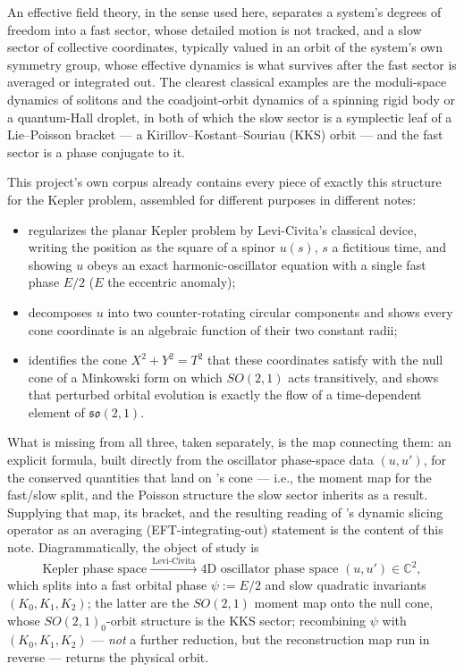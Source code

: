 \documentclass[11pt]{amsart}
\theoremstyle{remark}
\begin{document}
An effective field theory, in the sense used here, separates a system's degrees of freedom into a fast sector, whose detailed motion is not tracked, and a slow sector of collective coordinates, typically valued in an orbit of the system's own symmetry group, whose effective dynamics is what survives after the fast sector is averaged or integrated out. The clearest classical examples are the moduli-space dynamics of solitons and the coadjoint-orbit dynamics of a spinning rigid body or a quantum-Hall droplet, in both of which the slow sector is a symplectic leaf of a Lie--Poisson bracket --- a Kirillov--Kostant--Souriau (KKS) orbit --- and the fast sector is a phase conjugate to it.

This project's own corpus already contains every piece of exactly this structure for the Kepler problem, assembled for different purposes in different notes:

\begin{itemize}
\item \cite{Ebert2026LeviCivita} regularizes the planar Kepler problem by Levi-Civita's classical device, writing the position as the square of a spinor $u(s)$, $s$ a fictitious time, and showing $u$ obeys an exact harmonic-oscillator equation with a single fast phase $E/2$ ($E$ the eccentric anomaly);
\item \cite{Ebert2026Epicycle} decomposes $u$ into two counter-rotating circular components and shows every cone coordinate is an algebraic function of their two constant radii;
\item \cite{Ebert2026Cone} identifies the cone $X^2+Y^2=T^2$ that these coordinates satisfy with the null cone of a Minkowski form on which $SO(2,1)$ acts transitively, and shows that perturbed orbital evolution is exactly the flow of a time-dependent element of $\mathfrak{so}(2,1)$.
\end{itemize}

What is missing from all three, taken separately, is the map connecting them: an explicit formula, built directly from the oscillator phase-space data $(u,u')$, for the conserved quantities that land on \cite{Ebert2026Cone}'s cone --- i.e., the moment map for the fast/slow split, and the Poisson structure the slow sector inherits as a result. Supplying that map, its bracket, and the resulting reading of \cite{Ebert2026Cone}'s dynamic slicing operator as an averaging (EFT-integrating-out) statement is the content of this note. Diagrammatically, the object of study is
\[
\text{Kepler phase space} \xrightarrow{\ \text{Levi-Civita}\ } \text{4D oscillator phase space } (u,u')\in\mathbb C^2,
\]
which splits into a fast orbital phase $\psi:=E/2$ and slow quadratic invariants $(K_0,K_1,K_2)$; the latter are the $SO(2,1)$ moment map onto the null cone, whose $SO(2,1)_0$-orbit structure is the KKS sector; recombining $\psi$ with $(K_0,K_1,K_2)$ --- \emph{not} a further reduction, but the reconstruction map run in reverse --- returns the physical orbit.
\end{document}
